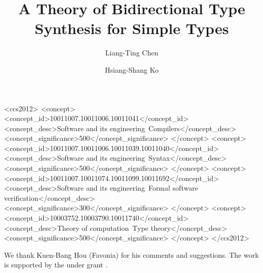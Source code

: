 \documentclass[acmsmall,screen,review,anonymous]{acmart}
\author{Liang-Ting Chen}
\author{Hsiang-Shang Ko}
\affiliation{%
  \institution{Academia Sinica}
  \streetaddress{128 Academia Road}
  \city{Taipei}
  \country{Taiwan}
  \postcode{115}
}
\title{A Theory of Bidirectional Type Synthesis for Simple Types}
\theoremstyle{acmdefinition}
\begin{document}
\begin{CCSXML}
<ccs2012>
   <concept>
       <concept_id>10011007.10011006.10011041</concept_id>
       <concept_desc>Software and its engineering~Compilers</concept_desc>
       <concept_significance>500</concept_significance>
       </concept>
   <concept>
       <concept_id>10011007.10011006.10011039.10011040</concept_id>
       <concept_desc>Software and its engineering~Syntax</concept_desc>
       <concept_significance>500</concept_significance>
       </concept>
   <concept>
       <concept_id>10011007.10011074.10011099.10011692</concept_id>
       <concept_desc>Software and its engineering~Formal software verification</concept_desc>
       <concept_significance>300</concept_significance>
       </concept>
   <concept>
       <concept_id>10003752.10003790.10011740</concept_id>
       <concept_desc>Theory of computation~Type theory</concept_desc>
       <concept_significance>500</concept_significance>
       </concept>
 </ccs2012>
\end{CCSXML}



\maketitle










\begin{acks}
We thank Kuen-Bang {Hou (Favonia)} for his comments and suggestions.
The work is supported by the  under grant .
\end{acks}



\end{document}
